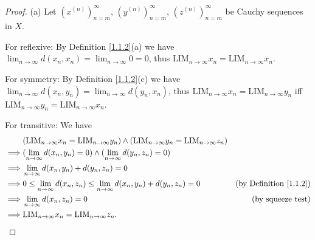 \begin{proof}{(a)}
    Let \((x^{(n)})_{n = m}^\infty\), \((y^{(n)})_{n = m}^\infty\), \((z^{(n)})_{n = m}^\infty\) be Cauchy sequences in \(X\).

    For reflexive:
    By Definition \ref{1.1.2}(a) we have \(\lim_{n \to \infty} d(x_n, x_n) = \lim_{n \to \infty} 0 = 0\), thus \(\text{LIM}_{n \to \infty} x_n = \text{LIM}_{n \to \infty} x_n\).

    For symmetry:
    By Definition \ref{1.1.2}(c) we have \(\lim_{n \to \infty} d(x_n, y_n) = \lim_{n \to \infty} d(y_n, x_n)\), thus \(\text{LIM}_{n \to \infty} x_n = \text{LIM}_{n \to \infty} y_n\) iff \(\text{LIM}_{n \to \infty} y_n = \text{LIM}_{n \to \infty} x_n\).

    For transitive:
    We have
    \begin{align*}
                 & (\text{LIM}_{n \to \infty} x_n = \text{LIM}_{n \to \infty} y_n) \land (\text{LIM}_{n \to \infty} y_n = \text{LIM}_{n \to \infty} z_n)                                      \\
        \implies & (\lim_{n \to \infty} d(x_n, y_n) = 0) \land (\lim_{n \to \infty} d(y_n, z_n) = 0)                                                                                          \\
        \implies & \lim_{n \to \infty} d(x_n, y_n) + d(y_n, z_n) = 0                                                                                                                          \\
        \implies & 0 \leq \lim_{n \to \infty} d(x_n, z_n) \leq \lim_{n \to \infty} d(x_n, y_n) + d(y_n, z_n) = 0                                         & \text{(by Definition \ref{1.1.2})} \\
        \implies & \lim_{n \to \infty} d(x_n, z_n) = 0                                                                                                   & \text{(by squeeze test)}           \\
        \implies & \text{LIM}_{n \to \infty} x_n = \text{LIM}_{n \to \infty} z_n.
    \end{align*}
\end{proof}

